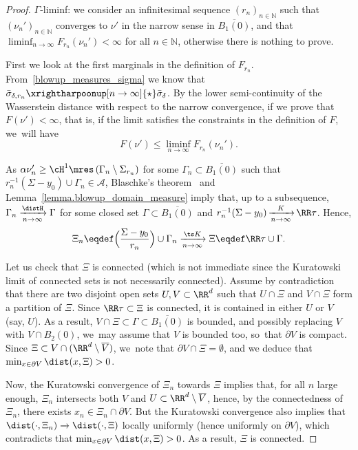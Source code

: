 \begin{proof}

$\Gamma$-liminf: we consider an infinitesimal sequence $(r_n)_{n \in \mathbb{N}}$ such that ${(\nu_{n}')}_{n \in \mathbb{N}}$ converges to $\nu'$ in the narrow
sense in $\overline{B_1(0)}$, and that $\liminf_{n \to \infty} F_{r_n}(\nu_n') < \infty$ for all $n \in \mathbb{N}$, otherwise there is nothing to prove.

First we look at the first marginals in the definition of $F_{r_n}$. From~\eqref{blowup_measures_sigma} we know that $\bar \sigma_{\delta, r_n}\xrightharpoonup[n \to \infty]{\star} \bar\sigma_{\delta}$.
By the lower semi-continuity of the Wasserstein distance with respect to the narrow convergence,
if we prove that $F(\nu') < \infty$, that is, if the limit satisfies the constraints in the definition of $F$, we~will have
\[
F(\nu') \le \liminf_{n \to \infty} F_{r_n}(\nu_n').
\]

As $\alpha \nu_n' \ge \cH^1\mres \left(\Gamma_{n}\setminus\Sigma_{r_n}\right)$ for some $\Gamma_n \subset \overline{B_1(0)}$ such that $r_n^{-1}(\Sigma-y_0)\cup \Gamma_n \in \mathcal{A}$, Blaschke's theorem~\cite[Th.\,6.1]{ambrosio2000functions}
and Lemma~\ref{lemma.blowup_domain_measure} imply that, up to a subsequence, $\Gamma_n \xrightarrow[n \to \infty]{\distH} \Gamma$ for some closed set $\Gamma \subset \overline{ B_1(0)}$ and $r_n^{-1}(\Sigma-y_0)\,{\xrightarrow[n \to \infty]{K}}\, \RR\tau$. Hence,
\[
\Xi_n
\eqdef
\Bigl(
\frac{\Sigma - y_0}{r_n}
\Bigr)
\cup \Gamma_n
\xrightarrow[n \to \infty]{\ts K}
\Xi
\eqdef
\RR\tau \cup \Gamma.
\]

Let us check that $\Xi$ is connected (which is not immediate since the Kuratowski limit of connected sets is not necessarily connected).
Assume by contradiction that there are two disjoint open sets $U,V \subset \RR^d$ such that $U\cap \Xi$ and $V\cap \Xi$ form a partition of $\Xi$. Since $\RR\tau \subset \Xi$ is connected, it is contained in either $U$ or $V$ (say, $U$). As a result, $V\cap \Xi\subset \Gamma \subset \overline{B_1(0)}$ is bounded, and possibly replacing $V$ with $V\cap B_2(0)$, we~may assume that $V$ is bounded too, so~that $\partial V$ is compact.
Since $\Xi\subset V\cap (\RR^d\setminus \overline{V})$, we~note that $\partial V \cap \Xi=\emptyset$, and we deduce that $\min_{x\in \partial V} \dist(x,\Xi)>0$.

Now, the Kuratowski convergence of $\Xi_n$ towards $\Xi$ implies that, for all $n$ large enough, $\Xi_n$ intersects both $V$ and $U\subset \RR^d\setminus \overline{V}$, hence, by the connectedness of $\Xi_n$, there exists $x_n\in \Xi_n \cap \partial V$.
But the Kuratowski convergence also implies that $\dist(\cdot,\Xi_n) \xrightarrow[]{} \dist(\cdot,\Xi)$ locally uniformly (hence uniformly on $\partial V$), which contradicts that $\min_{x\in \partial V} \dist(x,\Xi)>0$. As a result, $\Xi$ is connected.


\end{proof}

